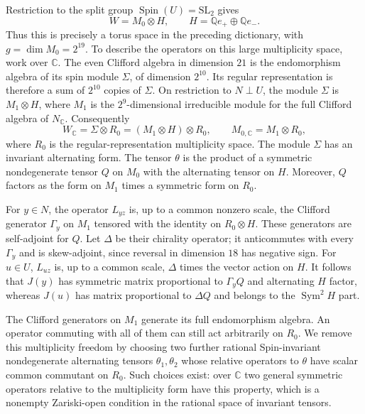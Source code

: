 \documentclass[11pt]{article}
\numberwithin{equation}{section}
\theoremstyle{definition}
\theoremstyle{remark}
\begin{document}
Restriction to the split group $\operatorname{Spin}(U)=\mathrm{SL}_2$ gives
\[
 W=M_0\otimes H,
 \qquad H=\mathbb Q e_+\oplus\mathbb Q e_-.
\]
Thus this is precisely a torus space in the preceding dictionary,
with $g=\dim M_0=2^{19}$.  To describe the operators on this large
multiplicity space, work over $\mathbb C$.  The even Clifford algebra in
dimension $21$ is the endomorphism algebra of its spin module
$\Sigma$, of dimension $2^{10}$.  Its regular representation is
therefore a sum of $2^{10}$ copies of $\Sigma$.  On restriction to
$N\perp U$, the module $\Sigma$ is $M_1\otimes H$, where $M_1$
is the $2^9$-dimensional irreducible module for the full Clifford
algebra of $N_{\mathbb C}$.  Consequently
\begin{equation}
 \label{ks:multiplicity}
 W_{\mathbb C}=\Sigma\otimes R_0=(M_1\otimes H)\otimes R_0,
 \qquad M_{0,\mathbb C}=M_1\otimes R_0,
\end{equation}
where $R_0$ is the regular-representation multiplicity space.
The module $\Sigma$ has an invariant alternating form.  The tensor $\theta$ is the
product of a symmetric nondegenerate tensor $Q$ on $M_0$ with
the alternating tensor on $H$.  Moreover, $Q$ factors as the
form on $M_1$ times a symmetric form on $R_0$.

For $y\in N$, the operator $L_{yz}$ is, up to a common nonzero
scale, the Clifford generator $\Gamma_y$ on $M_1$ tensored with
the identity on $R_0\otimes H$.  These generators are
self-adjoint for $Q$.  Let $\Delta$ be their chirality operator;
it anticommutes with every $\Gamma_y$ and is skew-adjoint,
since reversal in dimension $18$ has negative sign.  For
$u\in U$, $L_{uz}$ is, up to a common scale, $\Delta$ times
the vector action on $H$.  It follows that $J(y)$ has symmetric
matrix proportional to $\Gamma_yQ$ and alternating $H$ factor,
whereas $J(u)$ has matrix proportional to $\Delta Q$ and
belongs to the $\operatorname{Sym}^2H$ part.

The Clifford generators on $M_1$ generate its full endomorphism
algebra.  An operator commuting with all of them can still act
arbitrarily on $R_0$.  We remove this multiplicity freedom by choosing
two further rational Spin-invariant nondegenerate
alternating tensors $\theta_1,\theta_2$ whose relative
operators to $\theta$ have scalar common commutant on $R_0$.
Such choices exist: over $\mathbb C$ two general symmetric operators
relative to the multiplicity form have this property, which is
a nonempty Zariski-open condition in the rational space of
invariant tensors.
\end{document}
